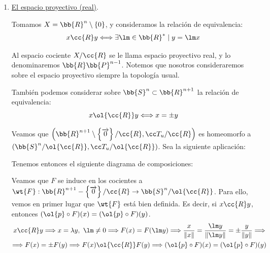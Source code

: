 \begin{ejemplo}
\begin{enumerate}
        Como el Toro es homeomorfo a $\left([0,1]\times [0,1]/\cc{R}, \T_u/\cc{R}\right)$, entonces por transitividad es homeomorfo a $\left(\bb{S}^1\times \bb{S}^1, {\T_u^4}_{\bb{S}^1\times \bb{S}^1}\right)$.

        \item \ul{El espacio proyectivo (real)}.

        Tomamos $X=\bb{R}^n\setminus \left\{0\right\}$, y consideramos la relación de equivalencia:
        \begin{equation*}
            x\cc{R}y \Longleftrightarrow \exists\lm \in \bb{R}^\ast\mid y =\lm x 
        \end{equation*}

        Al espacio cociente $X/\cc{R}$ se le llama espacio proyectivo real, y lo denominaremos $\bb{R}\bb{P}^{n-1}$. Notemos que nosotros consideraremos sobre el espacio proyectivo siempre la topología usual.

        También podemos considerar sobre $\bb{S}^n\subset \bb{R}^{n+1}$ la relación de equivalencia:
        \begin{equation*}
            x\ol{\cc{R}}y \Longleftrightarrow x=\pm y
        \end{equation*}

        
        Veamos que $\left(\bb{R}^{n+1}\setminus \left\{\vec{0}\right\}/\cc{R}, \T_u/\cc{R}\right)$ es homeomorfo a $(\bb{S}^n/\ol{\cc{R}}, \T_u/\ol{\cc{R}})$. Sea la siguiente aplicación:

        Tenemos entonces el siguiente diagrama de composiciones:
        \begin{figure}[H]
            \centering
        \end{figure}

        Veamos que $F$ se induce en los cocientes a $\wt{F}:\bb{R}^{n+1}-\left\{\vec{0}\right\}/\cc{R}\to \bb{S}^n/\ol{\cc{R}}$. Para ello, vemos en primer lugar que $\wt{F}$ está bien definida. Es decir, si $x\cc{R}y$, entonces $(\ol{p}\circ F)(x) = (\ol{p}\circ F)(y)$.
        \begin{multline*}
            x\cc{R}y \Longrightarrow x=\lambda y,~\lm \neq 0 \Longrightarrow F(x)=F(\lm y) \Longrightarrow \frac{x}{\|x\|} = \frac{\lm y}{\|\lm y\|} = \pm \frac{y}{\|y\|} \Longrightarrow \\ \Longrightarrow F(x) = \pm F(y) \Longrightarrow F(x)\ol{\cc{R}}F(y) \Longrightarrow (\ol{p}\circ F)(x) = (\ol{p}\circ F)(y)
        \end{multline*}


\end{enumerate}
\end{ejemplo}
